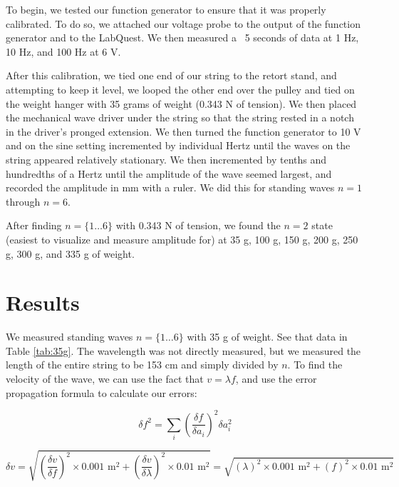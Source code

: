 \documentclass[12pt,letterpaper]{article}
\begin{document}
To begin, we tested our function generator to ensure that it was properly calibrated. To do so, we attached our voltage probe to the output of the function generator and to the LabQuest. We then measured a ~5 seconds of data at 1 Hz, 10 Hz, and 100 Hz at 6 V.

After this calibration, we tied one end of our string to the retort stand, and attempting to keep it level, we looped the other end over the pulley and tied on the weight hanger with 35 grams of weight (0.343 N of tension). We then placed the mechanical wave driver under the string so that the string rested in a notch in the driver's pronged extension. We then turned the function generator to 10 V and on the sine setting incremented by individual Hertz until the waves on the string appeared relatively stationary. We then incremented by tenths and hundredths of a Hertz until the amplitude of the wave seemed largest, and recorded the amplitude in mm with a ruler. We did this for standing waves $n=1$ through $n=6$.

After finding $n=\{1\dots 6\}$ with 0.343 N of tension, we found the $n=2$ state (easiest to visualize and measure amplitude for) at 35 g, 100 g, 150 g, 200 g, 250 g, 300 g, and 335 g of weight.

\section{Results}

We measured standing waves $n=\{1\dots 6\}$ with 35 g of weight. See that data in Table \ref{tab:35g}. The wavelength was not directly measured, but we measured the length of the entire string to be 153 cm and simply divided by $n$. To find the velocity of the wave, we can use the fact that $v=\lambda f$, and use the error propagation formula to calculate our errors:

\begin{equation}
    \delta f^2=\sum_i \left(\frac{\delta f}{\delta a_i}\right)^2\delta a_i^2
\end{equation}

\begin{equation*}
    \delta v = \sqrt{\left(\frac{\delta v}{\delta f}\right)^2 \times 0.001 \text{ m}^2 + \left(\frac{\delta v}{\delta \lambda}\right)^2 \times 0.01 \text{ m}^2}=\sqrt{\left(\lambda\right)^2 \times 0.001 \text{ m}^2 + \left(f\right)^2 \times 0.01 \text{ m}^2}
\end{equation*}
\end{document}
